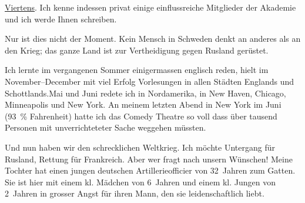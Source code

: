 \pstart
           \uline{Viertens}. Ich kenne indessen privat einige
               einflussreiche Mitglieder der Akademie und ich werde Ihnen schreiben.\pend
           
\pstart
           Nur ist dies nicht der Moment. Kein Mensch in Schweden denkt an anderes als an den Krieg; das ganze Land ist zur
               Vertheidigung gegen Rusland gerüstet.\pend
           
\pstart
           {\pb}Ich lernte im vergangenen Sommer
               einigermassen englisch reden, hielt im November–December
               mit viel Erfolg Vorlesungen in allen Städten Englands und Schottlands.\hspace*{2em}Mai und Juni redete ich in Nordamerika, in New Haven, Chicago, Minneapolis und New York. An meinem
               letzten Abend in New York im Juni
                  (93 {\%} Fahrenheit) hatte ich das Comedy Theatre so voll dass über tausend Personen mit
               unverrichteteter Sache weggehen müssten.\pend
           
\pstart
           Und nun haben wir den schrecklichen Weltkrieg. Ich möchte Untergang für Rusland, Rettung für Frankreich. Aber wer fragt nach unsern Wünschen! Meine Tochter hat einen jungen
               deutschen Artillerieofficier
               von 32 Jahren zum Gatten. Sie ist hier mit einem kl. Mädchen von 6 Jahren und einem kl. Jungen von 2 Jahren in
               grosser Angst für ihren Mann,
               den sie leidenschaftlich liebt.\pend
           
